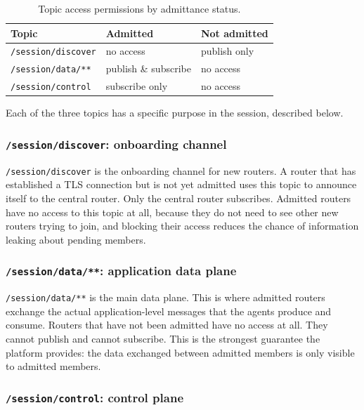 \documentclass[11pt,a4paper]{article}
\begin{document}
\begin{table}[H]
  \centering
  \begin{tabular}{|l|l|l|}
    \hline
    \rowcolor{gray!15}
    \textbf{Topic} & \textbf{Admitted} & \textbf{Not admitted} \\
    \hline
    \texttt{/session/discover} & no access & publish only \\
    \hline
    \texttt{/session/data/**} & publish \& subscribe & no access \\
    \hline
    \texttt{/session/control} & subscribe only & no access \\
    \hline
  \end{tabular}
  \caption{Topic access permissions by admittance status.}
  \label{tab:topics}
\end{table}

Each of the three topics has a specific purpose in the session, described below.

\subsubsection{\texttt{/session/discover}: onboarding channel}

\texttt{/session/discover} is the onboarding channel for new routers.
A router that has established a TLS connection but is not yet
admitted uses this topic to announce itself to the central router.
Only the central router subscribes. Admitted routers have no access
to this topic at all, because they do not need to see other new
routers trying to join, and blocking their access reduces the chance
of information leaking about pending members.

\subsubsection{\texttt{/session/data/**}: application data plane}

\texttt{/session/data/**} is the main data plane. This is where
admitted routers exchange the actual application-level messages that
the agents produce and consume. Routers that have not been admitted
have no access at all. They cannot publish and cannot subscribe. This
is the strongest guarantee the platform provides: the data exchanged
between admitted members is only visible to admitted members.

\subsubsection{\texttt{/session/control}: control plane}
\end{document}
